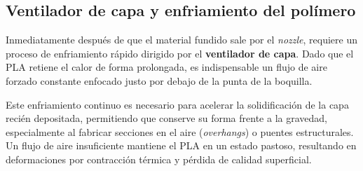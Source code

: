 \subsection{Ventilador de capa y enfriamiento del polímero}

Inmediatamente después de que el material fundido sale por el \textit{nozzle}, requiere un proceso de enfriamiento rápido dirigido por el \textbf{ventilador de capa}. Dado que el PLA retiene el calor de forma prolongada, es indispensable un flujo de aire forzado constante enfocado justo por debajo de la punta de la boquilla. 

Este enfriamiento continuo es necesario para acelerar la solidificación de la capa recién depositada, permitiendo que conserve su forma frente a la gravedad, especialmente al fabricar secciones en el aire (\textit{overhangs}) o puentes estructurales. Un flujo de aire insuficiente mantiene el PLA en un estado pastoso, resultando en deformaciones por contracción térmica y pérdida de calidad superficial.

